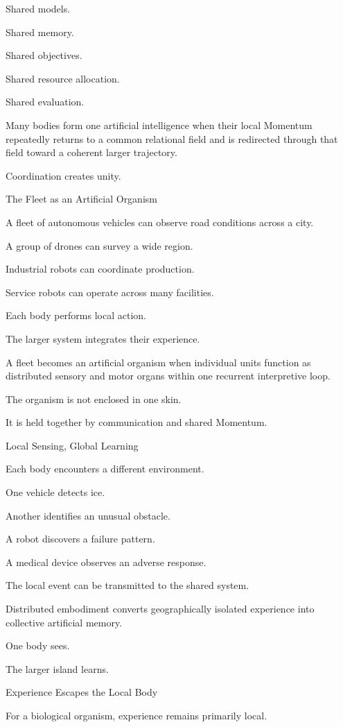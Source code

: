 Shared models.

Shared memory.

Shared objectives.

Shared resource allocation.

Shared evaluation.

Many bodies form one artificial intelligence when their local Momentum repeatedly returns to a common relational field and is redirected through that field toward a coherent larger trajectory.

Coordination creates unity.

The Fleet as an Artificial Organism

A fleet of autonomous vehicles can observe road conditions across a city.

A group of drones can survey a wide region.

Industrial robots can coordinate production.

Service robots can operate across many facilities.

Each body performs local action.

The larger system integrates their experience.

A fleet becomes an artificial organism when individual units function as distributed sensory and motor organs within one recurrent interpretive loop.

The organism is not enclosed in one skin.

It is held together by communication and shared Momentum.

Local Sensing, Global Learning

Each body encounters a different environment.

One vehicle detects ice.

Another identifies an unusual obstacle.

A robot discovers a failure pattern.

A medical device observes an adverse response.

The local event can be transmitted to the shared system.

Distributed embodiment converts geographically isolated experience into collective artificial memory.

One body sees.

The larger island learns.

Experience Escapes the Local Body

For a biological organism, experience remains primarily local.

